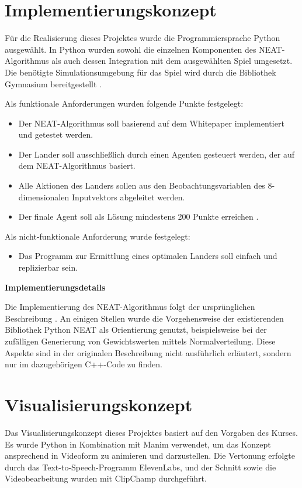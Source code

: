 \section{Implementierungskonzept}
Für die Realisierung dieses Projektes wurde die Programmiersprache Python ausgewählt. In Python wurden sowohl die einzelnen Komponenten des NEAT-Algorithmus als auch dessen Integration mit dem ausgewählten Spiel umgesetzt. Die benötigte Simulationsumgebung für das Spiel wird durch die Bibliothek Gymnasium bereitgestellt \cite{gymnasiumbib}.

Als funktionale Anforderungen wurden folgende Punkte festgelegt:
\begin{itemize}
	\item Der NEAT-Algorithmus soll basierend auf dem Whitepaper implementiert und getestet werden.
	\item Der Lander soll ausschließlich durch einen Agenten gesteuert werden, der auf dem NEAT-Algorithmus basiert.
	\item Alle Aktionen des Landers sollen aus den Beobachtungsvariablen des 8-dimensionalen Inputvektors abgeleitet werden.
	\item Der finale Agent soll als Lösung mindestens 200 Punkte erreichen \cite{gymnasiumdoc}.
\end{itemize}

Als nicht-funktionale Anforderung wurde festgelegt:
\begin{itemize}
	\item Das Programm zur Ermittlung eines optimalen Landers soll einfach und replizierbar sein.
\end{itemize}

\textbf{Implementierungsdetails}

Die Implementierung des NEAT-Algorithmus folgt der ursprünglichen Beschreibung \cite{NEAT}. An einigen Stellen wurde die Vorgehensweise der existierenden Bibliothek Python NEAT \cite{pythonneat} als Orientierung genutzt, beispielsweise bei der zufälligen Generierung von Gewichtswerten mittels Normalverteilung. Diese Aspekte sind in der originalen Beschreibung nicht ausführlich erläutert, sondern nur im dazugehörigen C++-Code zu finden.

\section{Visualisierungskonzept}

Das Visualisierungskonzept dieses Projektes basiert auf den Vorgaben des Kurses. Es wurde Python in Kombination mit Manim verwendet, um das Konzept ansprechend in Videoform zu animieren und darzustellen. Die Vertonung erfolgte durch das Text-to-Speech-Programm ElevenLabs, und der Schnitt sowie die Videobearbeitung wurden mit ClipChamp durchgeführt.

